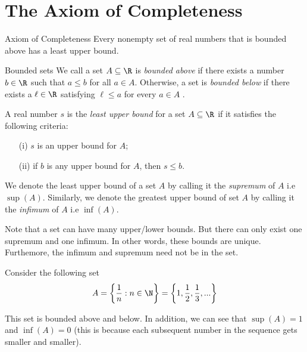 
\section{The Axiom of Completeness}



\begin{axiom}{Axiom of Completeness}{}
Every nonempty set of real numbers that is bounded above has a least upper bound.
\end{axiom}




\begin{definition}{Bounded sets}{}
        We call a set \( A \subseteq \R \) is \textit{bounded above} if there exists a number \( b \in \R \) such that \( a \leq b \) for all \( a \in A \).
        Otherwise, a set is \textit{bounded below} if there exists a \( \ell \in \R \) satisfying \( \ell \leq a \) for every \( a \in A \) .
\end{definition}






        A real number \( s \) is the \textit{least upper bound} for a set \( A \subseteq \R \) if it satisfies the following criteria:

        \begin{enumerate}
            \item[(i)] \( s \) is an upper bound for \( A \);
            \item[(ii)] if \( b \) is any upper bound for \( A \), then \( s \leq b \). 
        \end{enumerate}


        



We denote the least upper bound of a set \( A \) by calling it the \textit{supremum} of \( A \) i.e \( \sup(A) \). Similarly, we denote the greatest upper bound of set \( A \) by calling it the \textit{infimum} of \( A \) i.e \( \inf(A) \).

Note that a set can have many upper/lower bounds. But there can only exist one supremum and one infimum. In other words, these bounds are unique. Furthemore, the infimum and supremum need not be in the set.

Consider the following set
\[ A = \bigg\{ \frac{1}{n} : n \in \N \bigg\} = \bigg\{ 1,\frac{1}{2}, \frac{1}{3},... \bigg\}\]

This set is bounded above and below. In addition, we can see that \( \sup(A) = 1 \) and \( \inf(A) = 0 \) (this is because each subsequent number in the sequence gets smaller and smaller). 


